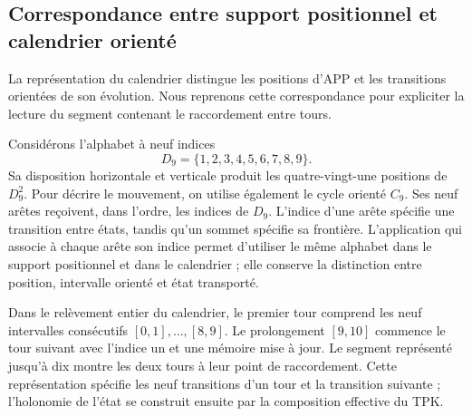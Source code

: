 \subsection{Correspondance entre support positionnel et calendrier orienté}
\label{ii:ampliacion-posicional-calendario}

La représentation du calendrier distingue les positions d'APP et les
transitions orientées de son évolution. Nous reprenons cette correspondance pour
expliciter la lecture du segment contenant le raccordement entre tours.

Considérons l'alphabet à neuf indices
\[
 D_9=\{1,2,3,4,5,6,7,8,9\}.
\]
Sa disposition horizontale et verticale produit les quatre-vingt-une positions
de \(D_9^2\). Pour décrire le mouvement, on utilise également le cycle
orienté \(C_9\). Ses neuf arêtes reçoivent, dans l'ordre, les indices de
\(D_9\). L'indice d'une arête spécifie une transition entre états,
tandis qu'un sommet spécifie sa frontière. L'application qui associe
à chaque arête son indice permet d'utiliser le même alphabet dans le support
positionnel et dans le calendrier ; elle conserve la distinction entre position,
intervalle orienté et état transporté.

Dans le relèvement entier du calendrier, le premier tour comprend
les neuf intervalles consécutifs \([0,1],\ldots,[8,9]\). Le prolongement
\([9,10]\) commence le tour suivant avec l'indice un et une mémoire
mise à jour. Le segment représenté jusqu'à dix montre les deux tours à leur
point de raccordement. Cette représentation spécifie les neuf transitions d'un
tour et la transition suivante ; l'holonomie de l'état se construit
ensuite par la composition effective du TPK.


